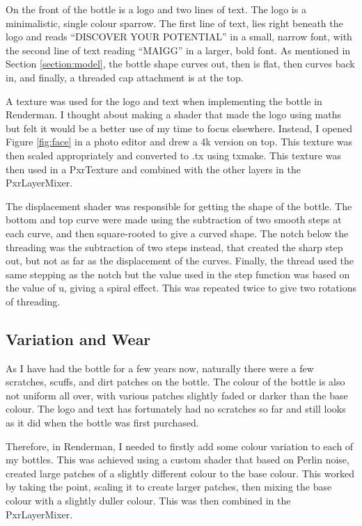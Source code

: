 \documentclass[notitlepage,12pt]{article}
\begin{document}
On the front of the bottle is a logo and two lines of text. The logo is a minimalistic, single colour sparrow. The first line of text, lies right beneath the logo and reads ``DISCOVER YOUR POTENTIAL'' in a small, narrow font, with the second line of text reading ``MAIGG'' in a larger, bold font. As mentioned in Section \ref{section:model}, the bottle shape curves out, then is flat, then curves back in, and finally, a threaded cap attachment is at the top.

A texture was used for the logo and text when implementing the bottle in Renderman. I thought about making a shader that made the logo using maths but felt it would be a better use of my time to focus elsewhere. Instead, I opened Figure \ref{fig:face} in a photo editor and drew a 4k version on top. This texture was then scaled appropriately and converted to .tx using txmake. This texture was then used in a PxrTexture and combined with the other layers in the PxrLayerMixer. 

The displacement shader was responsible for getting the shape of the bottle. The bottom and top curve were made using the subtraction of two smooth steps at each curve, and then square-rooted to give a curved shape. The notch below the threading was the subtraction of two steps instead, that created the sharp step out, but not as far as the displacement of the curves. Finally, the thread used the same stepping as the notch but the value used in the step function was based on the value of u, giving a spiral effect. This was repeated twice to give two rotations of threading.

\subsection{Variation and Wear}

As I have had the bottle for a few years now, naturally there were a few scratches, scuffs, and dirt patches on the bottle. The colour of the bottle is also not uniform all over, with various patches slightly faded or darker than the base colour. The logo and text has fortunately had no scratches so far and still looks as it did when the bottle was first purchased.

Therefore, in Renderman, I needed to firstly add some colour variation to each of my bottles. This was achieved using a custom shader that based on Perlin noise, created large patches of a slightly different colour to the base colour. This worked by taking the point, scaling it to create larger patches, then mixing the base colour with a slightly duller colour. This was then combined in the PxrLayerMixer.
\end{document}
